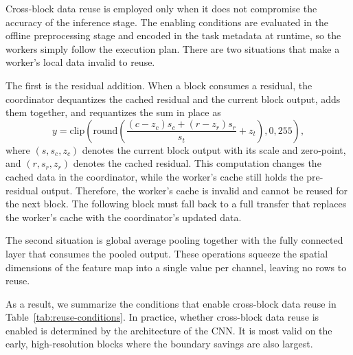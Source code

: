 

Cross-block data reuse is employed only when it does not compromise the accuracy of the inference stage. The enabling conditions are evaluated in the offline preprocessing stage and encoded in the task metadata at runtime, so the workers simply follow the execution plan. There are two situations that make a worker's local data invalid to reuse.

The first is the residual addition. When a block consumes a residual, the coordinator dequantizes the cached residual and the current block output, adds them together, and requantizes the sum in place as
\begin{equation}
    y = \mathrm{clip}(\mathrm{round}(\frac{(c-z_c)s_c+(r-z_r)s_r}{s_t} + z_t), 0, 255),
\end{equation}
where $(s,s_c,z_c)$ denotes the current block output with its scale and zero-point, and $(r,s_r,z_r)$ denotes the cached residual. This computation changes the cached data in the coordinator, while the worker's cache still holds the pre-residual output. Therefore, the worker's cache is invalid and cannot be reused for the next block. The following block must fall back to a full transfer that replaces the worker's cache with the coordinator's updated data.

The second situation is global average pooling together with the fully connected layer that consumes the pooled output. These operations squeeze the spatial dimensions of the feature map into a single value per channel, leaving no rows to reuse.

As a result, we summarize the conditions that enable cross-block data reuse in Table~\ref{tab:reuse-conditions}. In practice, whether cross-block data reuse is enabled is determined by the architecture of the CNN. It is most valid on the early, high-resolution blocks where the boundary savings are also largest. 


